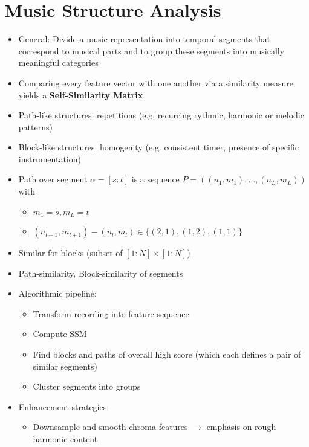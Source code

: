 \documentclass{scrartcl}
\begin{document}
\section{Music Structure Analysis}
\begin{itemize}
    \item
        General: Divide a music representation into temporal segments that correspond to musical parts and to group these segments into musically meaningful categories
    \item
        Comparing every feature vector with one another via a similarity measure yields a \textbf{Self-Similarity Matrix}
    \item
        Path-like structures: repetitions (e.g. recurring rythmic, harmonic or melodic patterns)
    \item
        Block-like structures: homogenity (e.g. consistent timer, presence of specific instrumentation)
    \item
        Path over segment $\alpha = [s:t]$ is a sequence $P = ((n_1, m_1), \dots, (n_L, m_L))$ with
        \begin{itemize}
            \item
                $m_1 = s, m_L = t$
            \item
                $(n_{l+1}, m_{l+1}) - (n_{l}, m_{l}) \in \{(2,1), (1,2), (1,1)\}$
        \end{itemize}
    \item
        Similar for blocks (subset of $[1:N] \times [1:N]$)
    \item
        Path-similarity, Block-similarity of segments
    \item
        Algorithmic pipeline:
        \begin{itemize}
            \item
                Transform recording into feature sequence
            \item
                Compute SSM
            \item
                Find blocks and paths of overall high score (which each defines a pair of similar segments)
            \item
                Cluster segments into groups
        \end{itemize}
    \item
        Enhancement strategies:
        \begin{itemize}
            \item
                Downsample and smooth chroma features $\rightarrow$ emphasis on rough harmonic content

\end{itemize}
\end{itemize}
\end{document}
